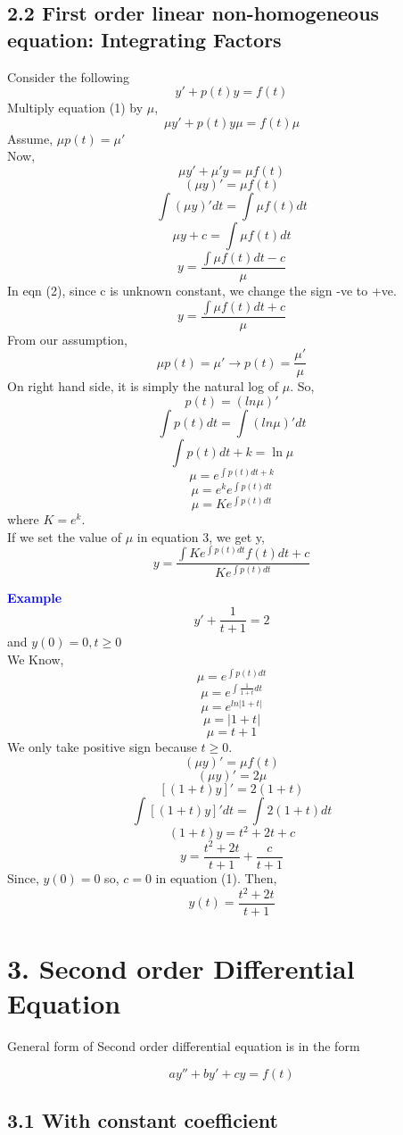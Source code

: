 \documentclass[
  11pt,
]{article}
\begin{document}
\subsection{2.2 First order linear non-homogeneous equation: Integrating
Factors}\label{first-order-linear-non-homogeneous-equation-integrating-factors}

Consider the following \[y'+p(t)y=f(t) \tag{1}\] Multiply equation (1)
by \(\mu\), \[\mu y'+p(t)y\mu=f(t)\mu\] Assume, \(\mu p(t) = \mu'\)\\
Now, \[\mu y'+\mu' y=\mu f(t)\] \[(\mu y)'=\mu f(t)\]
\[\int{(\mu y)'dt}=\int{\mu f(t)dt}\] \[\mu y +c = \int{\mu f(t)dt}\]
\[y = \frac{\int{\mu f(t)dt}-c}{\mu} \tag{2}\] In eqn (2), since c is
unknown constant, we change the sign -ve to +ve.
\[y = \frac{\int{\mu f(t)dt}+c}{\mu} \tag{3}\] From our assumption,
\[\mu p(t)=\mu' \longrightarrow p(t)=\frac{\mu'}{\mu}\] On right hand
side, it is simply the natural log of \(\mu\). So, \[p(t)=(ln\mu)'\]
\[\int{p(t)dt}=\int{(ln\mu)' dt}\] \[\int{p(t)dt+k}=\ln\mu\]
\[\mu = e^{\int{p(t)dt}+k}\] \[\mu = e^ke^{\int{p(t)dt}}\]
\[\mu = Ke^{\int{p(t)dt}} \tag{4}\] where \(K=e^k\).\\
If we set the value of \(\mu\) in equation 3, we get y,
\[y = \frac{\int{Ke^{\int{p(t)dt}} f(t)dt}+c}{Ke^{\int{p(t)dt}}} \tag{5}\]

\textbf{\textcolor{blue}{Example}} \[y' + \frac{1}{t+1}=2\] and
\(y(0)=0, t \geq 0\)\\
We Know, \[\mu = e^{\int{p(t)dt}}\] \[\mu = e^{\int{\frac{1}{1+t}dt}}\]
\[\mu = e^{ln|1+t|}\] \[\mu = |1+t|\] \[\mu = t+1\] We only take
positive sign because \(t \geq 0\). \[(\mu y)' = \mu f(t)\]
\[(\mu y)' = 2\mu\] \[[(1+t)y]'=2(1+t)\]
\[\int{[(1+t)y]'dt}=\int{2(1+t)dt}\] \[(1+t)y=t^2+2t+c\]
\[y=\frac{t^2+2t}{t+1}+\frac{c}{t+1} \tag{1}\] Since, \(y(0)=0\) so,
\(c = 0\) in equation (1). Then, \[y(t)=\frac{t^2+2t}{t+1} \tag{2}\]
\newpage

\section{3. Second order Differential
Equation}\label{second-order-differential-equation}

General form of Second order differential equation is in the form

\[
ay''+by'+cy=f(t)
\]

\subsection{3.1 With constant
coefficient}\label{with-constant-coefficient}
\end{document}
